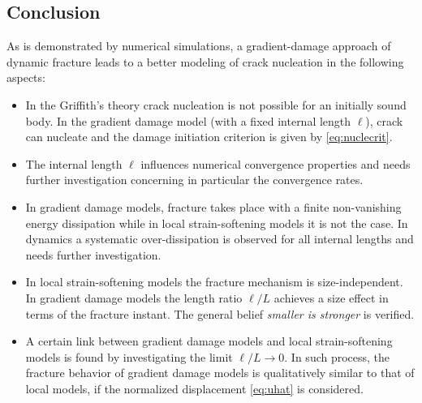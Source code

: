 \subsection*{Conclusion}
As is demonstrated by numerical simulations, a gradient-damage approach of dynamic fracture leads to a better modeling of crack nucleation in the following aspects:
\begin{itemize}
\item In the Griffith's theory crack nucleation is not possible for an initially sound body. In the gradient damage model (with a fixed internal length $\ell$), crack can nucleate and the damage initiation criterion is given by \eqref{eq:nuclecrit}.

\item The internal length $\ell$ influences numerical convergence properties and needs further investigation concerning in particular the convergence rates.

\item In gradient damage models, fracture takes place with a finite non-vanishing energy dissipation while in local strain-softening models it is not the case. In dynamics a systematic over-dissipation is observed for all internal lengths and needs further investigation.

\item In local strain-softening models the fracture mechanism is size-independent. In gradient damage models the length ratio $\ell/L$ achieves a size effect in terms of the fracture instant. The general belief \emph{smaller is stronger} is verified.

\item A certain link between gradient damage models and local strain-softening models is found by investigating the limit $\ell/L\to 0$. In such process, the fracture behavior of gradient damage models is qualitatively similar to that of local models, if the normalized displacement \eqref{eq:uhat} is considered.
\end{itemize}

